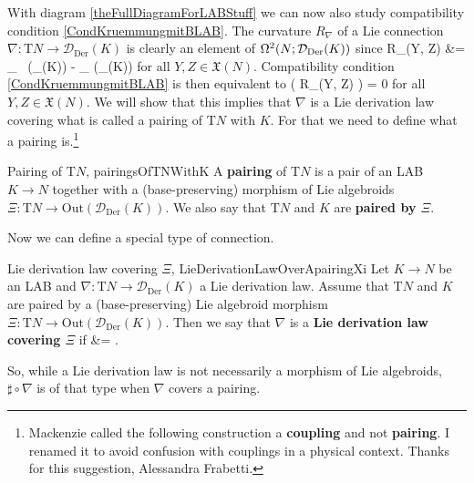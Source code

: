 With diagram \eqref{theFullDiagramForLABStuff} we can now also study compatibility condition \eqref{CondKruemmungmitBLAB}. The curvature $R_\nabla$ of a Lie connection $\nabla:\mathrm{T}N \to \mathcal{D}_{\mathrm{Der}}(K)$ is clearly an element of $\Omega^2\mleft(N; \mathcal{D}_{\mathrm{Der}}(K)\mright)$ since
\bas
R_\nabla(Y, Z)
&=
_{\in ~ \Gamma(_{}(K))}
	- \underbrace{\nabla_{[Y, Z]}}_{}
	\in \Gamma(_{}(K))
\eas
for all $Y, Z \in \mathfrak{X}(N)$. Compatibility condition \eqref{CondKruemmungmitBLAB} is then equivalent to
\ba
\sharp\mleft( R_\nabla(Y, Z) \mright) = 0
\ea
for all $Y, Z \in \mathfrak{X}(N)$. We will show that this implies that $\nabla$ is a Lie derivation law covering what is called a pairing of $\mathrm{T}N$ with $K$. For that we need to define what a pairing is.\footnote{Mackenzie called the following construction a \textbf{coupling} and not \textbf{pairing}. I renamed it to avoid confusion with couplings in a physical context. Thanks for this suggestion, Alessandra Frabetti.}

\begin{definitions}{Pairing of $\mathrm{T}N$, \cite[\S 7.2, Definitions 7.2.2; page 272]{mackenzieGeneralTheory}}{pairingsOfTNWithK}
A \textbf{pairing} of $\mathrm{T}N$ is a pair of an LAB $K \to N$ together with a (base-preserving) morphism of Lie algebroids $\Xi: \mathrm{T}N \to \mathrm{Out}(\mathcal{D}_{\mathrm{Der}}(K))$. We also say that $\mathrm{T}N$ and $K$ are \textbf{paired by $\Xi$}.
\end{definitions}

Now we can define a special type of connection.

\begin{definitions}{Lie derivation law covering $\Xi$, \newline\cite[\S 7.2, see discussion after Definition 7.2.2; page 272]{mackenzieGeneralTheory}}{LieDerivationLawOverApairingXi}
Let $K \to N$ be an LAB and $\nabla: \mathrm{T}N \to \mathcal{D}_{\mathrm{Der}}(K)$ a Lie derivation law. Assume that $\mathrm{T}N$ and $K$ are paired by a (base-preserving) Lie algebroid morphism $\Xi: \mathrm{T}N \to \mathrm{Out}(\mathcal{D}_{\mathrm{Der}}(K))$.
Then we say that $\nabla$ is a \textbf{Lie derivation law covering $\Xi$} if
\ba
\sharp \circ \nabla
&=
\Xi.
\ea
\end{definitions}

\begin{remark}
\leavevmode\newline
So, while a Lie derivation law is not necessarily a morphism of Lie algebroids, $\sharp \circ \nabla$ is of that type when $\nabla$ covers a pairing.
\end{remark}

